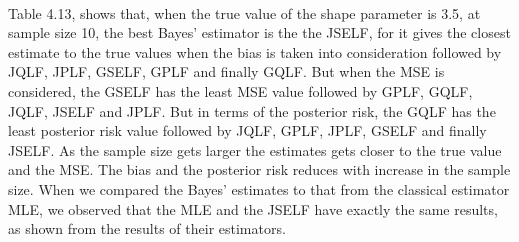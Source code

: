 \documentclass[a4paper,12pt]{report}
\begin{document}
{\begin{minipage}{\linewidth}
		
\end{minipage}
\\\vspace{1cm}

{\normalfont\indent Table 4.13, shows that, when the true value of the shape parameter is 3.5, at sample size 10, the best Bayes’ estimator is the the JSELF, for it gives the closest estimate to the true values when the bias is taken into consideration followed by JQLF, JPLF, GSELF, GPLF and finally GQLF. But when the MSE is considered, the GSELF has the least MSE value followed by GPLF, GQLF, JQLF, JSELF and JPLF. But in terms of the posterior risk, the GQLF has the least posterior risk value followed by JQLF, GPLF, JPLF, GSELF and finally JSELF.
As the sample size gets larger the estimates gets closer to the true value and the MSE. The bias and the posterior risk reduces with increase in the sample size. When we compared the Bayes’ estimates to that from the classical estimator MLE, we observed that the MLE and the JSELF have exactly the same results, as shown from the results of their estimators.\\
}


}
\end{document}
